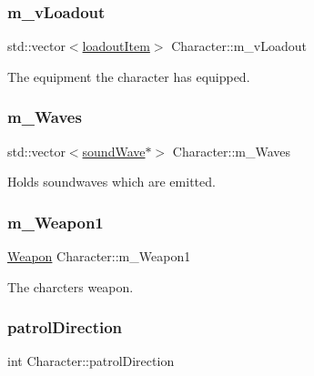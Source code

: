 \subsubsection{\texorpdfstring{m\+\_\+v\+Loadout}{m\_vLoadout}}
{\footnotesize\ttfamily std\+::vector$<$\hyperlink{_character_8h_a00971beaa8e80879643e933973580d61}{loadout\+Item}$>$ Character\+::m\+\_\+v\+Loadout\hspace{0.3cm}{\ttfamily [private]}}



The equipment the character has equipped. 

\mbox{\label{class_character_a562e96e907ef9fca8684c2db67e1e738}} 
\subsubsection{\texorpdfstring{m\+\_\+\+Waves}{m\_Waves}}
{\footnotesize\ttfamily std\+::vector$<$\hyperlink{classsound_wave}{sound\+Wave}$\ast$$>$ Character\+::m\+\_\+\+Waves\hspace{0.3cm}{\ttfamily [private]}}



Holds soundwaves which are emitted. 

\mbox{\label{class_character_aa5e5b12f44f1331e934b40435f258805}} 
\subsubsection{\texorpdfstring{m\+\_\+\+Weapon1}{m\_Weapon1}}
{\footnotesize\ttfamily \hyperlink{class_weapon}{Weapon} Character\+::m\+\_\+\+Weapon1\hspace{0.3cm}{\ttfamily [private]}}



The charcter\textquotesingle{}s weapon. 

\mbox{\label{class_character_a15115aab30dbd73eee49d3035a6bd94c}} 
\subsubsection{\texorpdfstring{patrol\+Direction}{patrolDirection}}
{\footnotesize\ttfamily int Character\+::patrol\+Direction\hspace{0.3cm}{\ttfamily [private]}}



